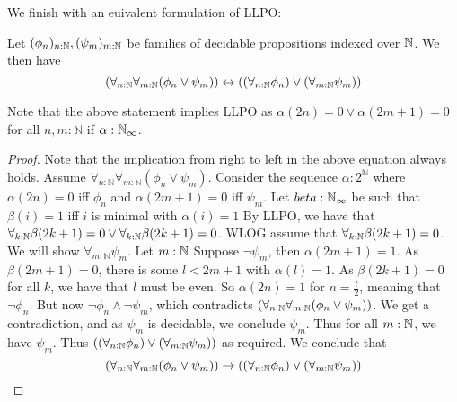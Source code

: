 We finish with an euivalent formulation of LLPO:
\begin{lemma}\label{corAlternativeLLPO}
  Let $(\phi_n)_{n:\mathbb{N}}, (\psi_m)_{m:\mathbb{N}}$ be families of decidable propositions indexed over $\mathbb{N}$.
  We then have 
  \begin{equation}
    (\forall_{n:\mathbb{N}} \forall_{m:\mathbb{N}} (\phi_n \vee \psi_m) )
    \leftrightarrow
    ((\forall_{n:\mathbb{N}} \phi_n) \vee (\forall_{m:\mathbb{N}} \psi_m) )
  \end{equation}
\end{lemma}
Note that the above statement implies LLPO as 
$\alpha(2n) =0 \vee \alpha(2m+1) =0$ for all $n,m:\mathbb N$ if $\alpha:\mathbb{N}_{\infty}$. 
\begin{proof}
  Note that the implication from right to left in the above equation always holds.
  Assume $\forall_{n:\mathbb N} \forall_{m:\mathbb N} (\phi_n \vee \psi_m)$. 
  Consider the sequence $\alpha:2^\mathbb N$ where $\alpha(2n) = 0$ iff $\phi_n$ and 
  $\alpha(2m+1) = 0$ iff $\psi_m$. 
  Let $\\beta:\mathbb{N}_{\infty}$ be such that $\beta(i) = 1$ iff $i$ is minimal with $\alpha(i) = 1$
%
  By LLPO, we have that 
  $\forall_{k:\mathbb{N}} \beta(2k+1) = 0\vee \forall_{k:\mathbb{N}} \beta(2k+1) = 0$. 
  WLOG assume that 
  $\forall_{k:\mathbb{N}} \beta(2k+1) = 0$. We will show $\forall_{m:\mathbb N} \psi_m$. 
  Let $m:\mathbb{N}$
  Suppose $\neg \psi_m$, then $\alpha(2m+1) = 1$. 
  As $\beta(2m+1) = 0$, there is some $l<2m+1$ with $\alpha(l) = 1$. 
  As $\beta(2k+1) = 0$ for all $k$, we have that $l$ must be even. 
  So $\alpha(2n) = 1$ for $n = \frac{l}2$, meaning that $\neg \phi_n$. 
  But now $\neg \phi_n \wedge \neg \psi_m$, which contradicts 
  $(\forall_{n:\mathbb{N}} \forall_{m:\mathbb{N}} (\phi_n \vee \psi_m) )$. 
  We get a contradiction, and as $\psi_m$ is decidable, we conclude $\psi_m$. 
  Thus for all $m:\mathbb{N}$, we have $\psi_m$. Thus 
  $((\forall_{n:\mathbb{N}} \phi_n) \vee (\forall_{m:\mathbb{N}} \psi_m) )$ 
  as required. 
%
  We conclude that 
  \begin{equation}
    (\forall_{n:\mathbb{N}} \forall_{m:\mathbb{N}} (\phi_n \vee \psi_m) )
    \to
    ((\forall_{n:\mathbb{N}} \phi_n) \vee (\forall_{m:\mathbb{N}} \psi_m) )
  \end{equation}
\end{proof}
